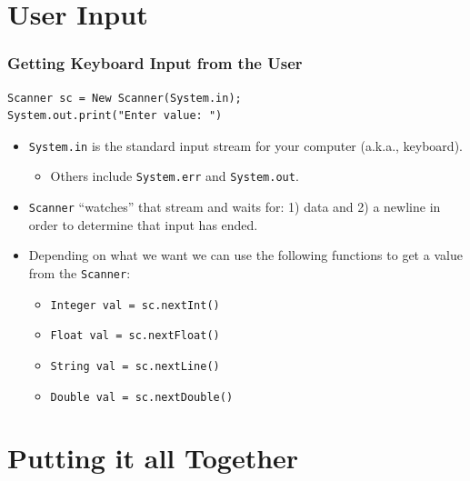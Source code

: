 \documentclass{beamer}
\begin{document}
\section{User Input}
\begin{frame}[fragile]
    \frametitle{Getting Keyboard Input from the User}
    \begin{lstlisting}[basicstyle=\scriptsize]
Scanner sc = New Scanner(System.in);
System.out.print("Enter value: ")
    \end{lstlisting}
    \begin{itemize}
        \item \lstinline|System.in| is the standard input stream for your computer (a.k.a., keyboard).
        \begin{itemize}
            \item Others include \lstinline|System.err| and \lstinline|System.out|.
        \end{itemize}
        \item \lstinline|Scanner| ``watches'' that stream and waits for: 1) data and 2) a newline in order to determine that input has ended.
        \item Depending on what we want we can use the following functions to get a value from the \lstinline|Scanner|:
        \begin{itemize}
            \item \lstinline|Integer val = sc.nextInt()|
            \item \lstinline|Float val = sc.nextFloat()|
            \item \lstinline|String val = sc.nextLine()|
            \item \lstinline|Double val = sc.nextDouble()|
        \end{itemize}
    \end{itemize}
\end{frame}

\section{Putting it all Together}
\end{document}
